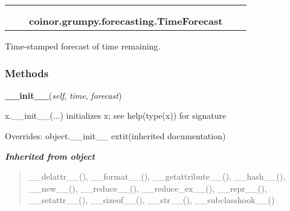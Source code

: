     \label{coinor:grumpy:forecasting:TimeForecast}
\begin{tabular}{cccccc}
\multicolumn{2}{r}{\settowidth{\BCL}{object}\multirow{2}{\BCL}{object}}
&&
  \\\cline{3-3}
  &&\multicolumn{1}{c|}{}
&&
  \\
&&\multicolumn{2}{l}{\textbf{coinor.grumpy.forecasting.TimeForecast}}
\end{tabular}

Time-stamped forecast of time remaining.



  \subsubsection{Methods}

    \vspace{0.5ex}

\hspace{.8\funcindent}\begin{boxedminipage}{\funcwidth}

    \raggedright \textbf{\_\_init\_\_}(\textit{self}, \textit{time}, \textit{forecast})

\setlength{\parskip}{2ex}
    x.\_\_init\_\_(...) initializes x; see help(type(x)) for signature

\setlength{\parskip}{1ex}
      Overrides: object.\_\_init\_\_ 	extit{(inherited documentation)}

    \end{boxedminipage}


\large{\textbf{\textit{Inherited from object}}}

\begin{quote}
\_\_delattr\_\_(), \_\_format\_\_(), \_\_getattribute\_\_(), \_\_hash\_\_(), \_\_new\_\_(), \_\_reduce\_\_(), \_\_reduce\_ex\_\_(), \_\_repr\_\_(), \_\_setattr\_\_(), \_\_sizeof\_\_(), \_\_str\_\_(), \_\_subclasshook\_\_()
\end{quote}


